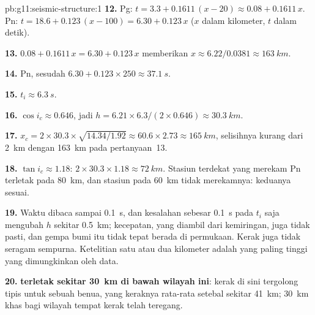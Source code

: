 \begin{solution}{pb:g11:seismic-structure:1}
\textbf{12.} Pg: $t = 3.3 + 0.1611\,(x - 20) \approx 0.08 + 0.1611\,x$. Pn:
$t = 18.6 + 0.123\,(x - 100) = 6.30 + 0.123\,x$ ($x$ dalam kilometer, $t$ dalam
detik).

\textbf{13.} $0.08 + 0.1611\,x = 6.30 + 0.123\,x$ memberikan $x \approx
6.22/0.0381 \approx \qty{163}{km}$.

\textbf{14.} Pn, sesudah $6.30 + 0.123 \times 250 \approx \qty{37.1}{s}$.

\textbf{15.} $t_i \approx \qty{6.3}{s}$.

\textbf{16.} $\cos i_c \approx 0.646$, jadi $h = 6.21 \times 6.3/(2 \times
0.646) \approx \qty{30.3}{km}$.

\textbf{17.} $x_c = 2 \times 30.3 \times \sqrt{14.34/1.92} \approx 60.6 \times
2.73 \approx \qty{165}{km}$, selisihnya kurang dari \qty{2}{km} dengan
\qty{163}{km} pada pertanyaan~13.

\textbf{18.} $\tan i_c \approx 1.18$: $2 \times 30.3 \times 1.18 \approx
\qty{72}{km}$. Stasiun terdekat yang merekam Pn terletak pada \qty{80}{km}, dan
stasiun pada \qty{60}{km} tidak merekamnya: keduanya sesuai.

\textbf{19.} Waktu dibaca sampai \qty{0.1}{s}, dan kesalahan sebesar
\qty{0.1}{s} pada $t_i$ saja mengubah $h$ sekitar \qty{0.5}{km}; kecepatan,
yang diambil dari kemiringan, juga tidak pasti, dan gempa bumi itu tidak tepat
berada di permukaan. Kerak juga tidak seragam sempurna. Ketelitian satu atau dua
kilometer adalah yang paling tinggi yang dimungkinkan oleh data.

\textbf{20.} \textbf{ terletak sekitar \qty{30}{km} di bawah wilayah ini}:
kerak di sini tergolong tipis untuk sebuah benua, yang keraknya rata-rata
setebal sekitar \qty{41}{km}; \qty{30}{km} khas bagi wilayah tempat kerak telah
teregang.
\end{solution}
